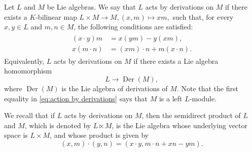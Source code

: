 \documentclass[11pt]{amsart}
\numberwithin{equation}{section}
\theoremstyle{definition}
\theoremstyle{remark}
\newcommand{\der}{\operatorname{Der}}
\begin{document}
Let $L$ and $M$ be Lie algebras. We say that $L$ acts by derivations on $M$  if there exists a $K$-bilinear map 
\(
L \times M \to M, (x, m) \mapsto x  m,
\)
such that, for every $x,y\in L$ and $m,n\in M$, the following conditions are satisfied: 
\begin{align} \label{eq:action by derivations}
    \begin{split}
        (x \cdot y) m &= x (y  m) - y  (x  m),\\
        x(m\cdot n) &=(xm)\cdot n+m(x\cdot n).
    \end{split}
\end{align}
Equivalently, $L$ acts  by derivations on $M$ if there exists a Lie algebra homomorphism $$L\to \der(M),$$ where $\der(M)$ is the Lie algebra of derivations of $M$.  Note that the first equality in \eqref{eq:action by derivations} says that $M$ is a left $L$-module.


We recall that if $L$ acts by derivations on $M$, then the semidirect product of $L$ and $M$, which is denoted by $L\ltimes M$, is  the Lie algebra whose underlying vector space is $L \times M$, and  whose  product is given by
\begin{equation}\label{eq semidirec bracket}
    (x,m)\cdot(y,n)=(x\cdot y,m\cdot n+xn-ym).
\end{equation}
\end{document}
